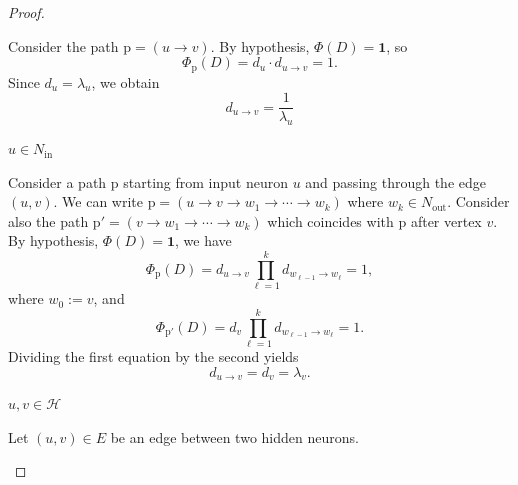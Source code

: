 \documentclass{article}
\theoremstyle{plain}
\theoremstyle{definition}
\theoremstyle{remark}
\def\path{{\mathrm{p}}}
\begin{document}
{\begin{proof}
\begin{itemize}
{\smallskip
Consider the path $\path = (u \rightarrow v)$.
By hypothesis, $\Phi(D) = \mathbf{1}$, so
\begin{equation}
    \Phi_\path(D) = d_u \cdot d_{u \rightarrow v} = 1.
\end{equation}
Since $d_u = \lambda_u$, we obtain
\begin{equation}
    d_{u \rightarrow v} = \frac{1}{\lambda_u}
\end{equation}

\medskip
\noindent{} \textbf{$u \in N_{\text{in}}$ }

\smallskip
Consider a path $\path$ starting from input neuron $u$ and passing through the edge $(u,v)$. We can write $\path = (u \rightarrow v \rightarrow w_1 \rightarrow \cdots \rightarrow w_k)$ where $w_k \in N_{\text{out}}$.
Consider also the path $\path' = (v \rightarrow w_1 \rightarrow \cdots \rightarrow w_k)$ which coincides with $\path$ after vertex $v$.
By hypothesis, $\Phi(D) = \mathbf{1}$, we have
\begin{equation}
    \Phi_{\path}(D) = d_{u \rightarrow v} \prod_{\ell=1}^{k} d_{w_{\ell-1} \rightarrow w_\ell} = 1,
\end{equation}
where $w_0 := v$, and
\begin{equation}
    \Phi_{\path'}(D) = d_{v} \prod_{\ell=1}^{k} d_{w_{\ell-1} \rightarrow w_\ell} = 1.
\end{equation}
Dividing the first equation by the second yields
\begin{equation}
    d_{u \rightarrow v} = d_{v} = \lambda_{v}.
\end{equation}

\medskip
\noindent{} \textbf{$u, v \in \mathcal{H}$}

\smallskip
Let $(u,v) \in E$ be an edge between two hidden neurons.

}
\end{itemize}
\end{proof}}
\end{document}
